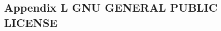 \documentclass[class=book, crop=false]{standalone}
\begin{document}
\begin{CJK}{UTF8}{gbsn}

\chapter*{Appendix L GNU GENERAL PUBLIC LICENSE}



\cleardoublepage

\end{CJK}
\end{document}
